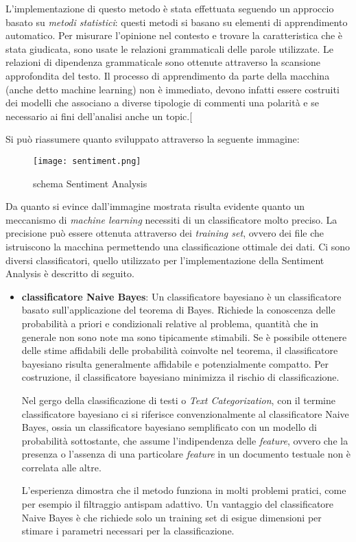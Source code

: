 L'implementazione di questo metodo è stata effettuata seguendo un approccio basato su \textit{metodi statistici}: questi metodi si basano su elementi di apprendimento automatico. Per misurare l'opinione nel contesto e trovare la caratteristica che è stata giudicata, sono usate le relazioni grammaticali delle parole utilizzate. Le relazioni di dipendenza grammaticale sono ottenute attraverso la scansione approfondita del testo. Il processo di apprendimento da parte della macchina (anche detto machine learning) non è immediato, devono infatti essere costruiti dei modelli che associano a diverse tipologie di commenti una polarità e se necessario ai fini dell'analisi anche un topic.[\cite{sentiment2}

Si può riassumere quanto sviluppato attraverso la seguente immagine:
\begin{figure}[!h]
    \begin{center}
      \texttt{[image: sentiment.png]}
	\caption{schema Sentiment Analysis}
    \end{center}
  \end{figure}
 
 Da quanto si evince dall'immagine mostrata risulta evidente quanto un meccanismo di \textit{machine learning} necessiti di un classificatore molto preciso. La precisione può essere ottenuta attraverso dei \textit{training set}, ovvero dei file che istruiscono la macchina permettendo una classificazione ottimale dei dati.
Ci sono diversi classificatori, quello utilizzato per l'implementazione della Sentiment Analysis è descritto di seguito.
\begin{itemize}
\item \textbf{classificatore Naive Bayes}\cite{Kevin2015sentiment}:
Un classificatore bayesiano è un classificatore basato sull'applicazione del teorema di Bayes.
Richiede la conoscenza delle probabilità a priori e condizionali relative al problema, quantità che in generale non sono note ma sono tipicamente stimabili. Se è possibile ottenere delle stime affidabili delle probabilità coinvolte nel teorema, il classificatore bayesiano risulta generalmente affidabile e potenzialmente compatto. Per costruzione, il classificatore bayesiano minimizza il rischio di classificazione.

Nel gergo della classificazione di testi o \textit{Text Categorization}, con il termine classificatore bayesiano ci si riferisce convenzionalmente al classificatore Naive Bayes, ossia un classificatore bayesiano semplificato con un modello di probabilità sottostante, che assume l'indipendenza delle \textit{feature}, ovvero che la presenza o l'assenza di una particolare \textit{feature} in un documento testuale non è correlata alle altre.

L'esperienza dimostra che il metodo funziona in molti problemi pratici, come per esempio il filtraggio antispam adattivo. Un vantaggio del classificatore Naive Bayes è che richiede solo un training set di esigue dimensioni per stimare i parametri necessari per la classificazione.

\end{itemize}

